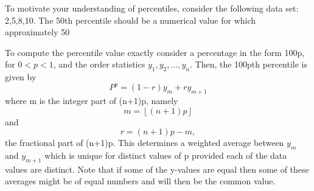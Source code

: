 \documentclass[10pt,]{book}
\theoremstyle{plain}
\theoremstyle{definition}
\theoremstyle{definition}
\theoremstyle{definition}
\numberwithin{equation}{section}
\newcommand{\lt}{ < }
\begin{document}
	To motivate your understanding of percentiles, consider the following data set: {2,5,8,10}. The 50th percentile should be a numerical value for which approximately 50%
\par
To compute the percentile value exactly consider a percentage in the form 100p, for \(0 \lt p \lt 1\), and the order statistics \(y_1, y_2, ..., y_n\). Then, the 100pth percentile is given by \begin{equation*}P^{p} = (1-r)y_m + ry_{m+1}\end{equation*}
	where m is the integer part of (n+1)p, namely \begin{equation*}m = \left\lfloor (n+1)p \right\rfloor
	\end{equation*} 
	and 
	\begin{equation*}r = (n+1)p - m,\end{equation*}
	the fractional part of (n+1)p.  This determines a weighted average between \(y_m\) and \(y_{m+1}\) which is unique for distinct values of p provided each of the data values are distinct. Note that if some of the y-values are equal then some of these averages might be of equal numbers and will then be the common value.%
\end{document}
